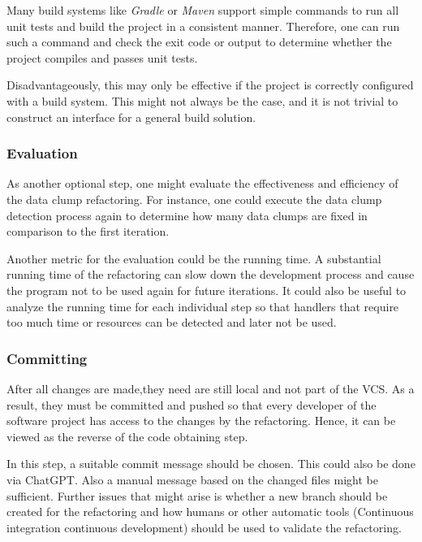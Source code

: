Many build systems like \textit{Gradle} or \textit{Maven} support simple commands to run all unit tests and build the project in a consistent manner.  Therefore, one can run such a command and check the exit code or output to determine whether the project compiles and passes unit tests.

Disadvantageously, this may only be effective if the project is correctly configured with a build system. This might not always be the case, and it is not trivial to construct an interface for a general build solution. 

\subsubsection{Evaluation}

As another optional step, one might evaluate the effectiveness and efficiency of the data clump refactoring. For instance, one could execute the data clump detection process again to determine how many data clumps are fixed in comparison to the first iteration. 

Another metric for the evaluation could be the running time. A substantial running time of the refactoring can slow down the development process and cause the program not to be used again for future iterations. It could also be useful to analyze the running time for each individual step so that handlers that require too much time or resources can be detected and later not be used. 

\subsubsection{Committing}

After all changes are made,they need are still local and not part of the \ac{VCS}. As a result, they must be committed and pushed so that every developer of the software project has access to the changes by the refactoring. Hence, it can be viewed as the reverse of the code obtaining step. 

In this step, a suitable commit message should be chosen. This could also be done via ChatGPT. Also a manual message based on the changed files might be sufficient. Further issues that might arise is whether a new branch should be created for the refactoring and how humans or other automatic tools (Continuous integration continuous development) should be used to validate the refactoring.  